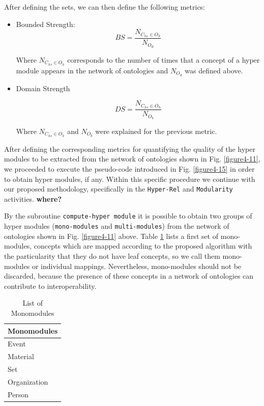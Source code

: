 After defining the sets, we can then define the following metrics:

\begin{itemize}
\item Bounded Strength:
\begin{equation}\label{eq.4.8}
	BS = \dfrac{N_{C_{hs}\in O_{h}}}{N_{O_{d}}}
\end{equation}

Where $N_{C_{hs}\in O_{h}}$  corresponds to the number of times that a concept of a hyper module appears in the network of ontologies and  ${N_{O_{d}}}$ was defined above.  


\item Domain Strength

\begin{equation}\label{eq.4.9}
	DS = \dfrac{N_{C_{hs}\in O_{h}}}{N_{O_{b}}}
\end{equation}


Where $N_{C_{hs}\in O_{h}}$ and ${N_{O_{b}}}$ were explained for the previous metric. 

\end{itemize}



After defining the corresponding metrics for quantifying the quality of the hyper modules to be extracted from the network of ontologies shown in Fig. \ref{figure4-11}, we proceeded to execute the pseudo-code introduced in Fig. \ref{figure4-15} in order to obtain hyper modules, if any. Within this specific procedure we continue with our proposed methodology, specifically in the \texttt{Hyper-Rel} and \texttt{Modularity} activities.  \textbf{where?}

By the subroutine \texttt{compute-hyper module} it is possible to obtain two groups of hyper modules (\texttt{mono-modules} and \texttt{multi-modules}) from the network of ontologies shown in Fig. \ref{figure4-11} above.  Table \ref{table4.6} lists a first set of mono-modules, concepts which are mapped according to the proposed algorithm with the particularity that they do not have leaf concepts, so we call them   mono-modules or individual mappings. Nevertheless, mono-modules should not be discarded, because the presence of these concepts in a network of ontologies can contribute to interoperability. 

\begin{table}[tp]%

\caption{List of Monomodules}
\label{table4.6}\centering
\begin{tabular}{ p{4cm}}\toprule
	
	\textbf{Monomodules} \\\toprule
	Event\\\toprule
	Material\\\toprule
	Set\\\toprule
	Organization\\\toprule
	Person\\\toprule
	
\end{tabular}

\end{table}


